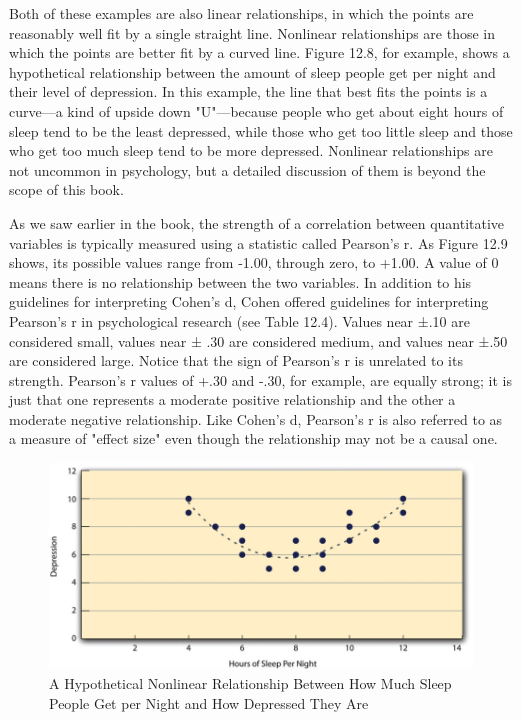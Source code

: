 Both of these examples are also linear relationships, in which the points are reasonably well fit by a single straight line. Nonlinear relationships are those in which the points are better fit by a curved line. Figure 12.8, for example, shows a hypothetical relationship between the amount of sleep people get per night and their level of depression. In this example, the line that best fits the points is a curve---a kind of upside down "U"---because people who get about eight hours of sleep tend to be the least depressed, while those who get too little sleep and those who get too much sleep tend to be more depressed. Nonlinear relationships are not uncommon in psychology, but a detailed discussion of them is beyond the scope of this book.

As we saw earlier in the book, the strength of a correlation between quantitative variables is typically measured using a statistic called Pearson's r. As Figure 12.9 shows, its possible values range from -1.00, through zero, to +1.00. A value of 0 means there is no relationship between the two variables. In addition to his guidelines for interpreting Cohen's d, Cohen offered guidelines for interpreting Pearson's r in psychological research (see Table 12.4). Values near ±.10 are considered small, values near ± .30 are considered medium, and values near ±.50 are considered large. Notice that the sign of Pearson's r is unrelated to its strength. Pearson's r values of +.30 and -.30, for example, are equally strong; it is just that one represents a moderate positive relationship and the other a moderate negative relationship. Like Cohen's d, Pearson's r is also referred to as a measure of "effect size" even though the relationship may not be a causal one.

\begin{figure}
\includegraphics[width=.7\linewidth]{figures/Fig12-8}
\caption{A Hypothetical Nonlinear Relationship Between How Much Sleep People Get per Night and How Depressed They Are}
\label{fig:nonlinear}
\end{figure}

